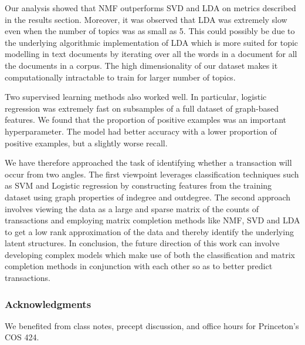 \documentclass{article} %
\begin{document}
Our analysis showed that NMF outperforms SVD and LDA on metrics described in the results section. Moreover, it was observed that LDA was extremely slow even when the number of topics was as small as 5. This could possibly be due to the underlying algorithmic implementation of LDA which is more suited for topic modelling in text documents by iterating over all the words in a document for all the documents in a corpus. The high dimensionality of our dataset makes it computationally intractable to train for larger number of topics.

Two supervised learning methods also worked well. In particular, logistic regression was extremely fast on subsamples of a full dataset of graph-based features. We found that the proportion of positive examples was an important hyperparameter. The model had better accuracy with a lower proportion of positive examples, but a slightly worse recall.

We have therefore approached the task of identifying whether a transaction will occur from two angles. The first viewpoint leverages classification techniques such as SVM and Logistic regression by constructing features from the training dataset using graph properties of indegree and outdegree. The second approach involves viewing the data as a large and sparse matrix of the counts of transactions and employing matrix completion methods like NMF, SVD and LDA to get a low rank approximation of the data and thereby identify the underlying latent structures. In conclusion, the future direction of this work can involve developing complex models which make use of both the classification and matrix completion methods in conjunction with each other so as to better predict transactions.

\subsubsection*{Acknowledgments}

We benefited from class notes, precept discussion, and office hours for Princeton's COS 424.



\end{document}
